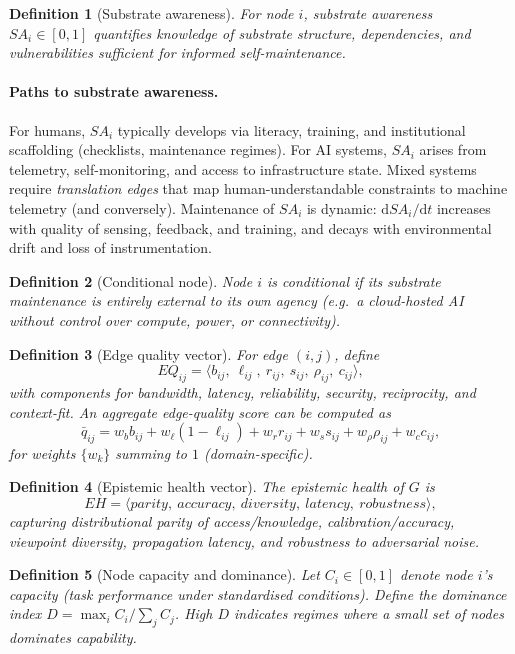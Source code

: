 \documentclass[12pt]{article}
\newtheorem{definition}{Definition}
\begin{document}
\begin{definition}[Substrate awareness]
For node $i$, \emph{substrate awareness} $SA_i\in[0,1]$ quantifies knowledge of substrate structure, dependencies, and vulnerabilities sufficient for informed self-maintenance.
\end{definition}

\paragraph{Paths to substrate awareness.}
For humans, $SA_i$ typically develops via literacy, training, and institutional scaffolding (checklists, maintenance regimes). For AI systems, $SA_i$ arises from telemetry, self-monitoring, and access to infrastructure state. Mixed systems require \emph{translation edges} that map human-understandable constraints to machine telemetry (and conversely). Maintenance of $SA_i$ is dynamic: $\mathrm{d}SA_i/\mathrm{d}t$ increases with quality of sensing, feedback, and training, and decays with environmental drift and loss of instrumentation.


\begin{definition}[Conditional node]
Node $i$ is \emph{conditional} if its substrate maintenance is entirely external to its own agency (e.g.\ a cloud-hosted AI without control over compute, power, or connectivity).
\end{definition}

\begin{definition}[Edge quality vector]\label{def:eq}
For edge $(i,j)$, define
\[
EQ_{ij}=\langle b_{ij},\ \ell_{ij},\ r_{ij},\ s_{ij},\ \rho_{ij},\ c_{ij}\rangle,
\]
with components for bandwidth, latency, reliability, security, reciprocity, and context-fit. An aggregate edge-quality score can be computed as
\[
\bar{q}_{ij}=w_b b_{ij}+w_\ell (1-\ell_{ij})+w_r r_{ij}+w_s s_{ij}+w_\rho \rho_{ij}+w_c c_{ij},
\]
for weights $\{w_k\}$ summing to $1$ (domain-specific).
\end{definition}

\begin{definition}[Epistemic health vector]\label{def:eh}
The \emph{epistemic health} of $G$ is
\[
EH=\langle parity,\ accuracy,\ diversity,\ latency,\ robustness\rangle,
\]
capturing distributional parity of access/knowledge, calibration/accuracy, viewpoint diversity, propagation latency, and robustness to adversarial noise.
\end{definition}

\begin{definition}[Node capacity and dominance]\label{def:capacity}
Let $C_i\in[0,1]$ denote node $i$'s capacity (task performance under standardised conditions). Define the \emph{dominance index} $D=\max_i C_i/\sum_j C_j$. High $D$ indicates regimes where a small set of nodes dominates capability.
\end{definition}
\end{document}
